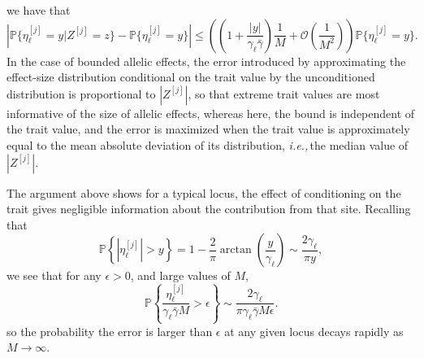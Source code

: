 \documentclass{article}
\renewcommand{\P}{\mathbb{P}}
\newcommand{\ie}{\textit{i.e.,}\,}
\newcommand{\1}{\mathbbm{1}}
\newcommand{\Oh}{{\mathcal O}}
\DeclareMathOperator*{\sgn}{sgn}
\theoremstyle{remark}
\theoremstyle{definition}
\begin{document}
we have that
\[
    \left|
    \P\{\eta^{[j]}_{\ell} = y \vert Z^{[j]} = z\} - \P\{\eta^{[j]}_{\ell} = y\}
    \right|
    \le \left(\left(1 + \frac{|y|}{\gamma_\ell \bar{\gamma}}\right) \frac{1}{M} + \Oh\left(\frac{1}{M^2}\right)\right)  \P\{\eta^{[j]}_{\ell} = y\}.
\]
In the case of bounded allelic effects, the error introduced by approximating the effect-size distribution conditional on the trait value by the unconditioned distribution is proportional to $|Z^{[j]}|$, so that extreme trait values are most informative of the size of allelic effects,
whereas here,
the bound is independent of the trait value,
and the error is maximized when the trait value is approximately equal to
the mean absolute deviation of its distribution, \ie the median value of $|Z^{[j]}|$.

The argument above shows for a typical locus, the effect of conditioning on the trait gives negligible information about the contribution from that site.   Recalling that
\[
    \P\left\{|\eta^{[j]}_{\ell}| > y\right\} =  1-\frac{2}{\pi} \arctan\left(\frac{y}{\gamma_{\ell}}\right) \sim \frac{2\gamma_{\ell}}{\pi y},
\]
we see that for any $\epsilon > 0$, and large values of $M$,
\[
    \P\left\{\frac{\eta^{[j]}_{\ell}}{\gamma_\ell \bar{\gamma} M} > \epsilon\right\} \sim \frac{2\gamma_{\ell}}{\pi \gamma_\ell \bar{\gamma} M \epsilon}.
\]
so the probability the error is larger than $\epsilon$ at any given locus decays rapidly as $M \to \infty$. 
\end{document}
